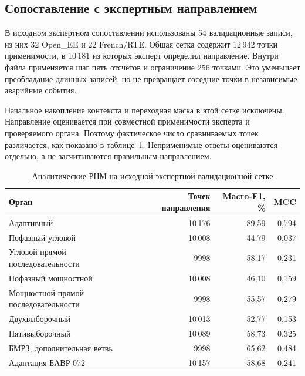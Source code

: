 \subsection{Сопоставление с экспертным направлением}
\label{sec:ch5_analytical_expert_comparison}

{}

В исходном экспертном сопоставлении использованы
54 валидационные записи, из них 32 Open\_EE
и 22 French/RTE.
Общая сетка содержит 12\,942 точки применимости,
в 10\,181 из которых эксперт определил направление.
Внутри файла применяется шаг пять отсчётов
и ограничение 256 точками.
Это уменьшает преобладание длинных записей,
но не превращает соседние точки
в независимые аварийные события.

Начальное накопление контекста и переходная
маска в этой сетке исключены.
Направление оценивается при совместной применимости
эксперта и проверяемого органа.
Поэтому фактическое число сравниваемых точек
различается, как показано в
таблице~\ref{tab:ch5_analytical_expert}.
Неприменимые ответы оцениваются отдельно,
а не засчитываются правильным направлением.

\begin{table}[htbp]
\centering\small
\caption{Аналитические РНМ на исходной экспертной
валидационной сетке}
\label{tab:ch5_analytical_expert}
\begin{tabularx}{\textwidth}{@{}Xrrr@{}}
\toprule
Орган & Точек направления & Macro-F1, \% & MCC \\
\midrule
Адаптивный & 10\,176 & 89,59 & 0,794 \\
Пофазный угловой & 10\,008 & 44,79 & 0,037 \\
Угловой прямой последовательности & 9998 & 58,17 & 0,231 \\
Пофазный мощностной & 10\,008 & 46,10 & 0,159 \\
Мощностной прямой последовательности & 9998 & 55,57 & 0,279 \\
Двухвыборочный & 10\,013 & 52,77 & 0,153 \\
Пятивыборочный & 10\,089 & 58,73 & 0,325 \\
БМРЗ, дополнительная ветвь & 9998 & 65,62 & 0,484 \\
Адаптация БАВР-072 & 10\,157 & 58,68 & 0,241 \\
\bottomrule
\end{tabularx}
\end{table}


